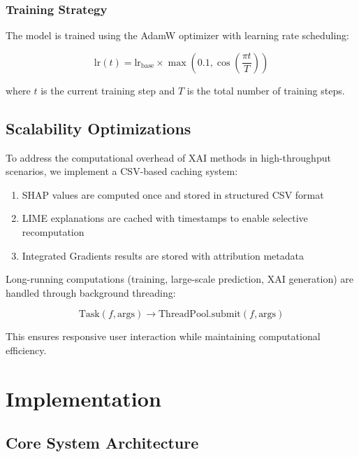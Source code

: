 \documentclass[preprint,12pt]{elsarticle}
\begin{document}
\subsubsection*{Training Strategy}

The model is trained using the AdamW optimizer with learning rate scheduling:

\begin{equation}
\text{lr}(t) = \text{lr}_{\text{base}} \times \max(0.1, \cos(\frac{\pi t}{T}))
\end{equation}

where $t$ is the current training step and $T$ is the total number of training steps.

\subsection{Scalability Optimizations}


To address the computational overhead of XAI methods in high-throughput scenarios, we implement a CSV-based caching system:

\begin{enumerate}
\item SHAP values are computed once and stored in structured CSV format
\item LIME explanations are cached with timestamps to enable selective recomputation
\item Integrated Gradients results are stored with attribution metadata
\end{enumerate}

 

Long-running computations (training, large-scale prediction, XAI generation) are handled through background threading:

\begin{equation}
\text{Task}(f, \text{args}) \rightarrow \text{ThreadPool.submit}(f, \text{args})
\end{equation}

This ensures responsive user interaction while maintaining computational efficiency.



\section{Implementation}
\label{sec:implementation}

\subsection{Core System Architecture}
\end{document}
